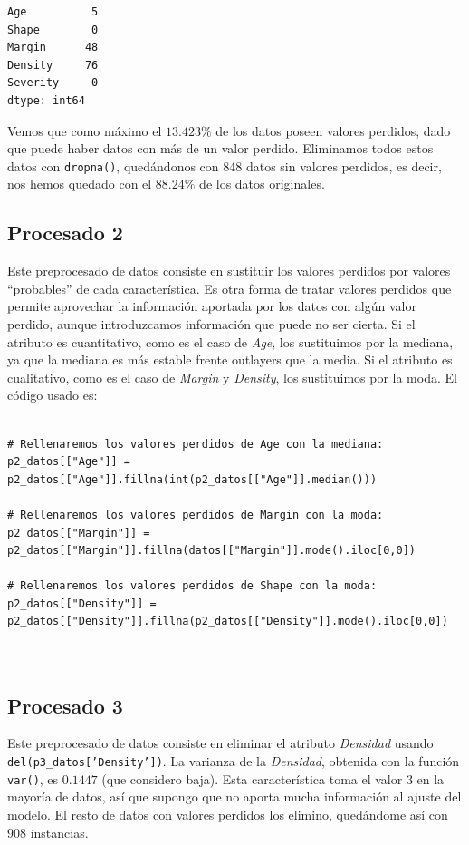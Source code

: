 \documentclass[a4]{article}
\begin{document}
\begin{verbatim}
Age          5
Shape        0
Margin      48
Density     76
Severity     0
dtype: int64
\end{verbatim}

Vemos que como máximo el $13.423\%$ de los datos poseen valores perdidos, dado que puede haber datos con más de un valor perdido. Eliminamos todos estos datos con \texttt{dropna()}, quedándonos con 848 datos sin valores perdidos, es decir, nos hemos quedado con el $88.24\%$ de los datos originales.

\subsection{Procesado 2}

Este preprocesado de datos consiste en sustituir los valores perdidos por valores ``probables'' de cada característica. Es otra forma de tratar valores perdidos que permite aprovechar la información aportada por los datos con algún valor perdido, aunque introduzcamos información que puede no ser cierta. Si el atributo es cuantitativo, como es el caso de \textit{Age}, los sustituimos por la mediana, ya que la mediana es más estable frente outlayers que la media. Si el atributo es cualitativo, como es el caso de \textit{Margin} y \textit{Density}, los sustituimos por la moda. El código usado es:

\begin{lstlisting}

# Rellenaremos los valores perdidos de Age con la mediana:
p2_datos[["Age"]] = p2_datos[["Age"]].fillna(int(p2_datos[["Age"]].median()))

# Rellenaremos los valores perdidos de Margin con la moda:
p2_datos[["Margin"]] = p2_datos[["Margin"]].fillna(datos[["Margin"]].mode().iloc[0,0])

# Rellenaremos los valores perdidos de Shape con la moda:
p2_datos[["Density"]] = p2_datos[["Density"]].fillna(p2_datos[["Density"]].mode().iloc[0,0])

  
\end{lstlisting}

\subsection{Procesado 3}

Este preprocesado de datos consiste en eliminar el atributo \textit{Densidad} usando \texttt{del(p3\_datos['Density'])}. La varianza de la \textit{Densidad}, obtenida con la función \texttt{var()}, es $0.1447$ (que considero baja). Esta característica toma el valor $3$ en la mayoría de datos, así que supongo que no aporta mucha información al ajuste del modelo. El resto de datos con valores perdidos los elimino, quedándome así con $908$ instancias.
\end{document}
